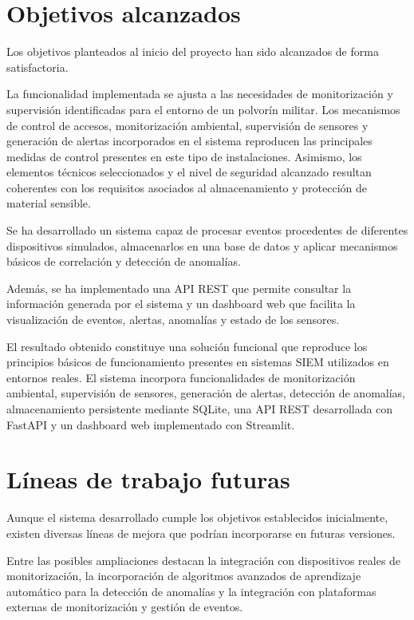 \section{Objetivos alcanzados}

Los objetivos planteados al inicio del proyecto han sido alcanzados de forma satisfactoria.

La funcionalidad implementada se ajusta a las necesidades de monitorización y supervisión identificadas para el entorno de un polvorín militar. Los mecanismos de control de accesos, monitorización ambiental, supervisión de sensores y generación de alertas incorporados en el sistema reproducen las principales medidas de control presentes en este tipo de instalaciones. Asimismo, los elementos técnicos seleccionados y el nivel de seguridad alcanzado resultan coherentes con los requisitos asociados al almacenamiento y protección de material sensible.

Se ha desarrollado un sistema capaz de procesar eventos procedentes de diferentes dispositivos simulados, almacenarlos en una base de datos y aplicar mecanismos básicos de correlación y detección de anomalías.

Además, se ha implementado una API REST que permite consultar la información generada por el sistema y un dashboard web que facilita la visualización de eventos, alertas, anomalías y estado de los sensores.

El resultado obtenido constituye una solución funcional que reproduce los principios básicos de funcionamiento presentes en sistemas SIEM utilizados en entornos reales. El sistema incorpora funcionalidades de monitorización ambiental, supervisión de sensores, generación de alertas, detección de anomalías, almacenamiento persistente mediante SQLite, una API REST desarrollada con FastAPI y un dashboard web implementado con Streamlit.


\section{Líneas de trabajo futuras}

Aunque el sistema desarrollado cumple los objetivos establecidos inicialmente, existen diversas líneas de mejora que podrían incorporarse en futuras versiones.

Entre las posibles ampliaciones destacan la integración con dispositivos reales de monitorización, la incorporación de algoritmos avanzados de aprendizaje automático para la detección de anomalías y la integración con plataformas externas de monitorización y gestión de eventos.

